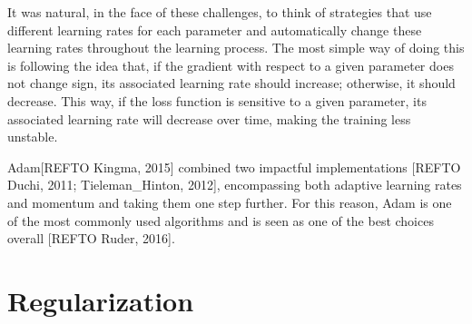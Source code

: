It was natural, in the face of these challenges, to think of strategies that use different learning rates for each parameter and automatically change these learning rates throughout the learning process.
The most simple way of doing this is following the idea that, if the gradient with respect to a given parameter does not change sign, its associated learning rate should increase; otherwise, it should decrease.
This way, if the loss function is sensitive to a given parameter, its associated learning rate will decrease over time, making the training less unstable.

Adam[REFTO Kingma, 2015] combined two impactful implementations [REFTO Duchi, 2011; Tieleman_Hinton, 2012], encompassing both adaptive learning rates and momentum and taking them one step further.
For this reason, Adam is one of the most commonly used algorithms and is seen as one of the best choices overall [REFTO Ruder, 2016].

\section{Regularization}

